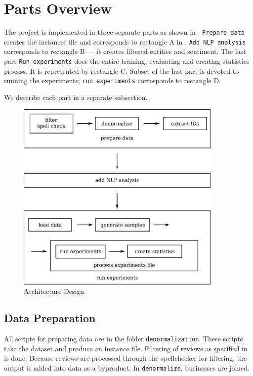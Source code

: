 \section{Parts Overview}

The project is implemented in three separate parts as shown in .
\texttt{Prepare data} creates the instances file and corresponds to rectangle A in .
\texttt{Add NLP analysis} corresponds to rectangle B --- it creates filtered entities and sentiment.
The last part \texttt{Run experiments} does the entire training, evaluating and creating statistics process.
It is represented by rectangle C.
Subset of the last part is devoted to running the experiments; \texttt{run experiments} corresponds to rectangle D.

We describe each part in a separate subsection.

\begin{figure}[ht]
	\centering
	\includegraphics[width=10cm]{figures/arch_process.eps}
	\caption{Architecture Design}\label{fig:arch_process}
\end{figure}


\subsection{Data Preparation} 

All scripts for preparing data are in the folder \texttt{denormalization}.
These scripts take the dataset and produce an instance file.
Filtering of reviews as specified in  is done.
Because reviews are processed through the spellchecker for filtering,
the output is added into data as a byproduct.
In \texttt{denormalize}, businesses are joined.

